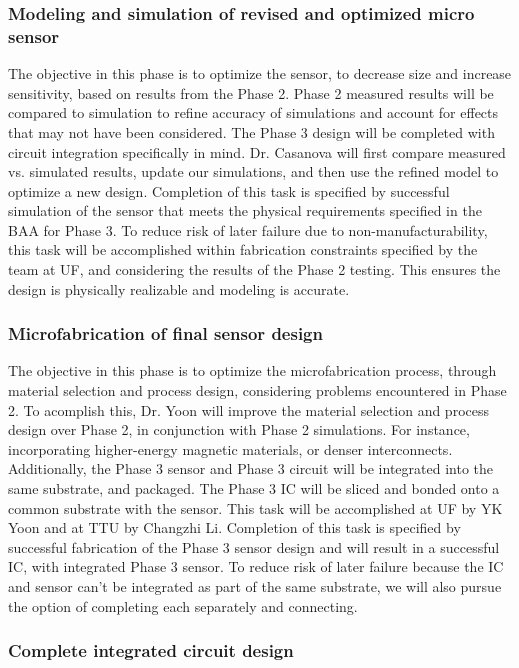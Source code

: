 \subsubsection{Modeling and simulation of revised and optimized micro sensor}\label{sec:p3:em}

The objective in this phase is to optimize the sensor, to decrease size and increase sensitivity, based on results from the Phase 2. Phase 2 measured results will be compared to simulation to refine accuracy of simulations and account for effects that may not have been considered. The Phase 3 design will be completed with circuit integration specifically in mind. Dr. Casanova will first compare measured vs. simulated results, update our simulations, and then use the refined model to optimize a new design. Completion of this task is specified by successful simulation of the sensor that meets the physical requirements specified in the BAA for Phase 3. To reduce risk of later failure due to non-manufacturability, this task will be accomplished within fabrication constraints specified by the team at UF, and considering the results of the Phase 2 testing. This ensures the design is physically realizable and modeling is accurate.

\subsubsection{Microfabrication of final sensor design}\label{sec:p3:mf}

The objective in this phase is to optimize the microfabrication process, through material selection and process design, considering problems encountered in Phase 2. To acomplish this, Dr. Yoon will improve the material selection and process design over Phase 2, in conjunction with Phase 2 simulations. For instance, incorporating higher-energy magnetic materials, or denser interconnects. Additionally, the Phase 3 sensor and Phase 3 circuit will be integrated into the same substrate, and packaged. The Phase 3 IC will be sliced and bonded onto a common substrate with the sensor.  This task will be accomplished at UF by YK Yoon and at TTU by Changzhi Li. Completion of this task is specified by successful fabrication of the Phase 3 sensor design and will result in a successful IC, with integrated Phase 3 sensor. To reduce risk of later failure because the IC and sensor can't be integrated as part of the same substrate, we will also pursue the option of completing each separately and connecting.

\subsubsection{Complete integrated circuit design}\label{sec:p3:cir}

